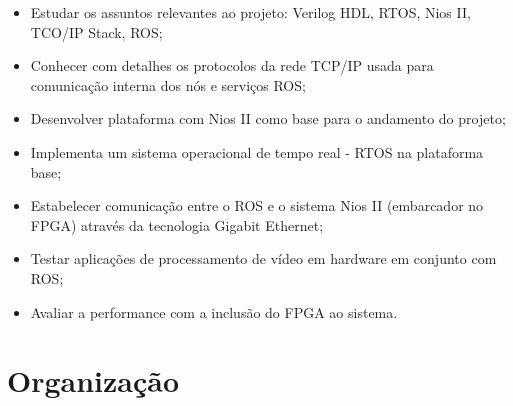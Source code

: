 \begin{itemize}
    \item Estudar os assuntos relevantes ao projeto: Verilog HDL, RTOS, Nios II, TCO/IP Stack, ROS;
    \item Conhecer com detalhes os protocolos da rede TCP/IP usada para comunicação interna dos nós e serviços ROS;
    \item Desenvolver plataforma com Nios II como base para o andamento do projeto;
    \item Implementa um sistema operacional de tempo real - RTOS na plataforma base;
    \item Estabelecer comunicação entre o ROS e o sistema Nios II (embarcador no FPGA) através da tecnologia Gigabit Ethernet;
    \item Testar aplicações de processamento de vídeo em hardware em conjunto com ROS;
    \item Avaliar a performance com a inclusão do FPGA ao sistema.
\end{itemize}


\section{Organização}



